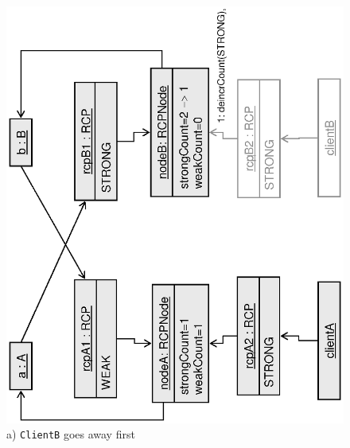 \documentclass[pdf,ps2pdf,11pt]{SANDreport}
\begin{document}
{\bsinglespace
\begin{figure}
\begin{center}
\includegraphics*[angle=270,scale=0.65]{CircularRCP_A_B_ClientB_1}
\\[2ex] a) {}\texttt{ClientB} goes away first \\[3ex]

\end{center}
\end{figure}}
\end{document}

